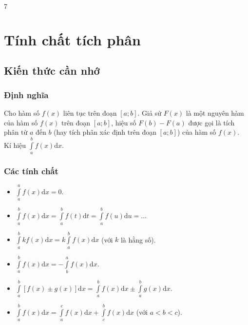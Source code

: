 \setcounter {section} {7}
\setcounter{ex}{0}
\section{Tính chất tích phân}
\subsection{Kiến thức cần nhớ}
\begin{khung}
	\subsubsection{Định nghĩa}
	Cho hàm số $ f(x) $ liên tục trên đoạn $ [a;b] $. Giả sử $ F(x) $ là một nguyên hàm của hàm số $ f(x) $ trên đoạn $ [a;b] $, hiệu số $ F(b)-F(a) $ được gọi là tích phân từ $ a $ đến $ b $ (hay tích phân xác định trên đoạn $ [a;b] $) của hàm số $ f(x) $.\\
	Kí hiệu $ \displaystyle\int\limits_{a}^{b} f(x)\mathrm{d}x $.\\
\subsubsection{Các tính chất}
	\begin{itemize}
		\item $ \displaystyle\int\limits_{a}^{a} f(x)\mathrm{d}x=0 $.
		\item $ \displaystyle\int\limits_{a}^{b} f(x)\mathrm{d}x=\displaystyle\int\limits_{a}^{b}f(t)\mathrm{d}t=\displaystyle\int\limits_{a}^{b} f(u)\mathrm{d} u=\ldots $
		\item $ \displaystyle\int\limits_{a}^{b} kf(x)\mathrm{d}x=k\displaystyle\int\limits_{a}^{b}f(x)\mathrm{d}x $ (với $ k $ là hằng số).
		\item $ \displaystyle\int\limits_{a}^{b}f(x)\mathrm{d}x=-\displaystyle\int\limits_{b}^{a}f(x)\mathrm{d}x $.
		\item $ \displaystyle\int\limits_{a}^{b} \left[f(x)\pm g(x)\right]\mathrm{d}x =\displaystyle\int\limits_{a}^{b} f(x)\mathrm{d}x \pm \displaystyle\int\limits_{a}^{b}g(x)\mathrm{d}x $.
		\item $ \displaystyle\int\limits_{a}^{b}f(x)\mathrm{d}x =\displaystyle\int\limits_{a}^{c}f(x)\mathrm{d}x +\displaystyle\int\limits_{c}^{b}f(x)\mathrm{d}x $ (với $ a<b<c $).
		
	\end{itemize}
\end{khung}
